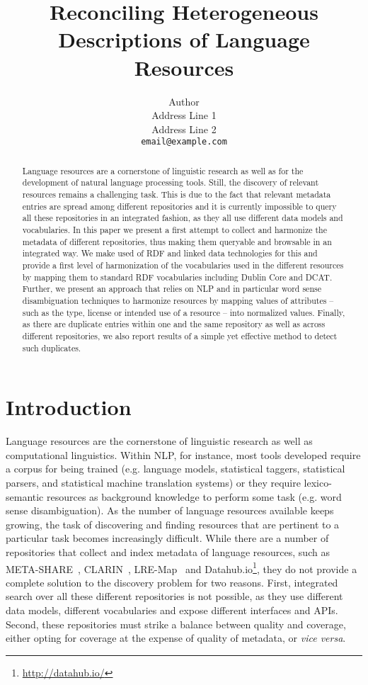\documentclass[11pt]{article}
\title{Reconciling Heterogeneous Descriptions of Language Resources}
\author{Author \\
    Address Line 1\\
    Address Line 2\\
{\scriptsize\tt email@example.com}}
\date{}
\begin{document}
\maketitle
\begin{abstract}
	Language resources are a cornerstone of linguistic research as well as for the development of natural language processing tools. 
	Still, the discovery of relevant resources remains a challenging task.
        This is due to the fact that relevant metadata entries are spread among
        different repositories and it is currently impossible to query all these
        repositories in an integrated fashion, as they all use different data
        models and vocabularies. In this paper we present a first attempt to
        collect and harmonize the metadata of different repositories, thus
        making them queryable and browsable in an integrated way. We make used
        of RDF and linked data technologies for this and provide a first level
        of harmonization of the vocabularies used in the different resources by
        mapping them to standard RDF vocabularies including Dublin Core and DCAT. Further, we present an approach that relies on NLP and in particular word sense disambiguation techniques to harmonize resources by mapping values of attributes -- such as the type, license or intended use of a resource -- into normalized values. Finally, as there are duplicate entries within one and the same repository as well as across different repositories, we also report results of a simple yet effective method to detect such duplicates.
\end{abstract}

\section{Introduction}

Language resources are the cornerstone of linguistic research as well as computational linguistics. Within NLP, for instance, most tools developed require a corpus for being trained (e.g. language models, statistical taggers, statistical parsers, and statistical machine translation systems) or they require lexico-semantic resources as background knowledge to perform some task (e.g. word sense disambiguation). 
As the number of language resources available keeps growing, the task of discovering and finding resources that are pertinent to a particular task becomes increasingly difficult. While there are a number of repositories that collect and index metadata of language resources, such as META-SHARE~\cite{federmann2012meta},
CLARIN~\cite{broeder2010data}, LRE-Map~\cite{calzolari2012lre} and
Datahub.io\footnote{\url{http://datahub.io/}}, they do not provide a complete solution to the discovery problem for two reasons. First, integrated search over all these different repositories is not possible, as they use different data models, different vocabularies and expose different interfaces and APIs. 
Second, these repositories must strike a balance between quality and coverage,
either opting for coverage at the expense of quality of metadata, or \emph{vice
versa}.
\end{document}
